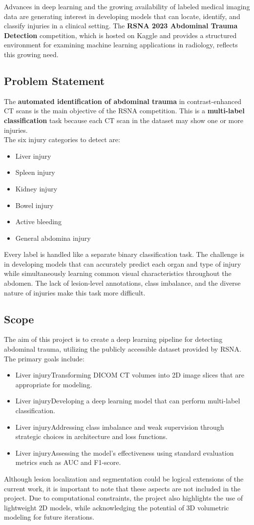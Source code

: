 \documentclass[a4paper,12pt]{article}
\begin{document}
Advances in deep learning and the growing availability of labeled medical imaging data are generating interest in developing models that can locate, identify, and classify injuries in a clinical setting. The \textbf{RSNA 2023 Abdominal Trauma Detection} competition, which is hosted on Kaggle and provides a structured environment for examining machine learning applications in radiology, reflects this growing need.
\subsection{Problem Statement}
The \textbf{automated identification of abdominal trauma} in contrast-enhanced CT scans is the main objective of the RSNA competition. This is a \textbf{multi-label classification} task because each CT scan in the dataset may show one or more injuries.\\
The six injury categories to detect are:
\begin{itemize}
    \item Liver injury
    \item Spleen injury
    \item Kidney injury
    \item Bowel injury
    \item Active bleeding
    \item General abdomina injury

\end{itemize}

Every label is handled like a separate binary classification task. The challenge is in developing models that can accurately predict each organ and type of injury while simultaneously learning common visual characteristics throughout the abdomen. The lack of lesion-level annotations, class imbalance, and the diverse nature of injuries make this task more difficult.
\subsection{Scope}
The aim of this project is to create a deep learning pipeline for detecting abdominal trauma, utilizing the publicly accessible dataset provided by RSNA. The primary goals include:
\begin{itemize}
    \item Liver injuryTransforming DICOM CT volumes into 2D image slices that are appropriate for modeling.
    \item Liver injuryDeveloping a deep learning model that can perform multi-label classification.
    \item Liver injuryAddressing class imbalance and weak supervision through strategic choices in architecture and loss functions.
    \item Liver injuryAssessing the model's effectiveness using standard evaluation metrics such as AUC and F1-score.
\end{itemize}
Although lesion localization and segmentation could be logical extensions of the current work, it is important to note that these aspects are not included in the project. Due to computational constraints, the project also highlights the use of lightweight 2D models, while acknowledging the potential of 3D volumetric modeling for future iterations. 
\end{document}
